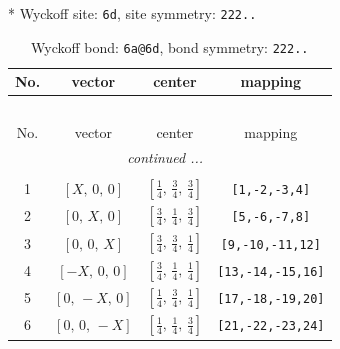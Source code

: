\documentclass[fleqn,8pt]{jsarticle}
\begin{document}
* Wyckoff site: {\tt 6d}, site symmetry: {\tt 222..}
\renewcommand{\arraystretch}{1.2}
\begin{longtable}{cccc}
\caption{Wyckoff bond: {\tt 6a@6d}, bond symmetry: {\tt 222..}}
 \\
 \hline \hline
No. & vector & center & mapping \\ \hline \endfirsthead

\multicolumn{3}{l}{\tablename\ \thetable{}} \\
 \hline \hline
No. & vector & center & mapping \\ \hline \endhead

 \hline \hline
\multicolumn{3}{r}{\footnotesize\it continued ...} \\ \endfoot

 \hline \hline
\multicolumn{3}{r}{} \\ \endlastfoot

1 & $\left[ X,\, 0,\, 0 \right]$ & $\left[ \frac{1}{4},\, \frac{3}{4},\, \frac{3}{4} \right]$ & {\tt [1,-2,-3,4]} \\ \hline
2 & $\left[ 0,\, X,\, 0 \right]$ & $\left[ \frac{3}{4},\, \frac{1}{4},\, \frac{3}{4} \right]$ & {\tt [5,-6,-7,8]} \\ \hline
3 & $\left[ 0,\, 0,\, X \right]$ & $\left[ \frac{3}{4},\, \frac{3}{4},\, \frac{1}{4} \right]$ & {\tt [9,-10,-11,12]} \\ \hline
4 & $\left[ - X,\, 0,\, 0 \right]$ & $\left[ \frac{3}{4},\, \frac{1}{4},\, \frac{1}{4} \right]$ & {\tt [13,-14,-15,16]} \\ \hline
5 & $\left[ 0,\, - X,\, 0 \right]$ & $\left[ \frac{1}{4},\, \frac{3}{4},\, \frac{1}{4} \right]$ & {\tt [17,-18,-19,20]} \\ \hline
6 & $\left[ 0,\, 0,\, - X \right]$ & $\left[ \frac{1}{4},\, \frac{1}{4},\, \frac{3}{4} \right]$ & {\tt [21,-22,-23,24]} \\
\end{longtable}
\renewcommand{\arraystretch}{1.2}
\end{document}
